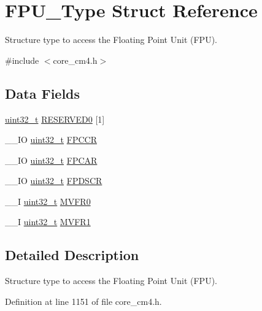 \hypertarget{struct_f_p_u___type}{\section{F\-P\-U\-\_\-\-Type Struct Reference}
\label{struct_f_p_u___type}
}


Structure type to access the Floating Point Unit (F\-P\-U).  




{\ttfamily \#include $<$core\-\_\-cm4.\-h$>$}

\subsection*{Data Fields}
\begin{DoxyCompactItemize}
\item 
\hyperlink{stdint_8h_a435d1572bf3f880d55459d9805097f62}{uint32\-\_\-t} \hyperlink{struct_f_p_u___type_a7b2967b069046c8544adbbc1db143a36}{R\-E\-S\-E\-R\-V\-E\-D0} \mbox{[}1\mbox{]}
\item 
\-\_\-\-\_\-\-I\-O \hyperlink{stdint_8h_a435d1572bf3f880d55459d9805097f62}{uint32\-\_\-t} \hyperlink{struct_f_p_u___type_a22054423086a3daf2077fb2f3fe2a8b8}{F\-P\-C\-C\-R}
\item 
\-\_\-\-\_\-\-I\-O \hyperlink{stdint_8h_a435d1572bf3f880d55459d9805097f62}{uint32\-\_\-t} \hyperlink{struct_f_p_u___type_aa48253f088dc524de80c42fbc995f66b}{F\-P\-C\-A\-R}
\item 
\-\_\-\-\_\-\-I\-O \hyperlink{stdint_8h_a435d1572bf3f880d55459d9805097f62}{uint32\-\_\-t} \hyperlink{struct_f_p_u___type_a4d58ef3ebea69a5ec5acd8c90a9941b6}{F\-P\-D\-S\-C\-R}
\item 
\-\_\-\-\_\-\-I \hyperlink{stdint_8h_a435d1572bf3f880d55459d9805097f62}{uint32\-\_\-t} \hyperlink{struct_f_p_u___type_a135577b0a76bd3164be2a02f29ca46f1}{M\-V\-F\-R0}
\item 
\-\_\-\-\_\-\-I \hyperlink{stdint_8h_a435d1572bf3f880d55459d9805097f62}{uint32\-\_\-t} \hyperlink{struct_f_p_u___type_a776e8625853e1413c4e8330ec85c256d}{M\-V\-F\-R1}
\end{DoxyCompactItemize}


\subsection{Detailed Description}
Structure type to access the Floating Point Unit (F\-P\-U). 

Definition at line 1151 of file core\-\_\-cm4.\-h.



